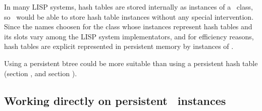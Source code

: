 In many LISP systems, hash tables are stored internally as instances
of a \ class, so \plob\ would be able to store hash
table instances without any special intervention. Since the names
choosen for the class whose instances represent hash tables and its
slots vary among the LISP system implementators, and for efficiency
reasons, hash tables are explicit represented in persistent memory by
instances of .  
\begin{NarrowRefList}
\ObjectStore {}
\ObjectLoad {}
\end{NarrowRefList}
Using a persistent btree could be more suitable than using a
persistent hash table (section , and
section ).

\subsection[Persistent CLOS instances]{Working directly on persistent
  \protect\clos\ instances}

